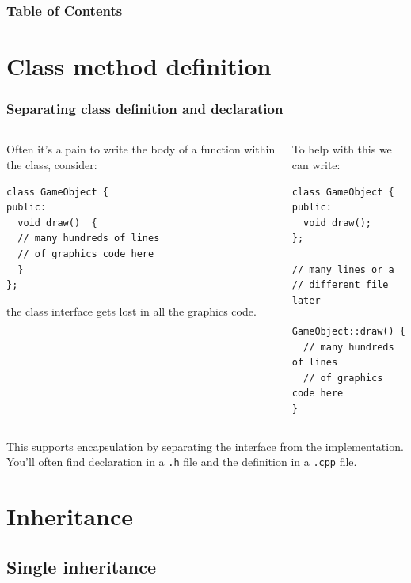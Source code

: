 \documentclass{beamer}
\subtitle{Session 5: Advanced object oriented programming}
\begin{document}
\frame{\titlepage}

\begin{frame}
\frametitle{Table of Contents}
\tableofcontents
\end{frame}

\section{Class method definition}

\begin{frame}[fragile]
  \frametitle{Separating class definition and declaration}
 
  \begin{columns}[t]
    \begin{column}[T]{0.5\linewidth}
  		Often it's a pain to write the body of a function within the class, consider:
  		\begin{lstlisting}
class GameObject {
public:
  void draw()  {
  // many hundreds of lines
  // of graphics code here
  }
};
  		\end{lstlisting}
  		the class interface gets lost in all the graphics code.
  	\end{column}
  	\pause
  	\begin{column}[T]{0.5\linewidth}
  		To help with this we can write:
		  \begin{lstlisting}
class GameObject {
public:
  void draw();
};

// many lines or a
// different file later

GameObject::draw() {
  // many hundreds of lines
  // of graphics code here
}
  		\end{lstlisting}
  	\end{column}
  \end{columns}
  \pause
  This supports encapsulation by separating the interface from the implementation.  You'll often find declaration in a \texttt{.h} file and the definition in a \texttt{.cpp} file.

\end{frame}

\section{Inheritance}

\subsection{Single inheritance}
\end{document}
